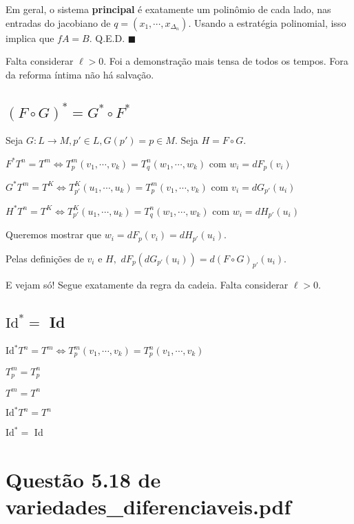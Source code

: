 \documentclass[10pt,a4paper]{article}
\begin{document}
		Em geral, o sistema \textbf{principal} \'e exatamente um polin\^omio de cada lado, nas entradas do jacobiano de $q = (x_1, \cdots, x_{\Delta_n})$. Usando a estrat\'egia polinomial, isso implica que $fA = B$. Q.E.D.$\,\,\blacksquare$

		Falta considerar $\ell > 0$. Foi a demonstra\c{c}\~ao mais tensa de todos os tempos. Fora da reforma \'intima n\~ao h\'a salva\c{c}\~ao.

		\subsection{$(F \circ G)^* = G^* \circ F^*$}
		\begin{flushright}
		\end{flushright}

		Seja $G: L \rightarrow M, p' \in L, G(p') = p \in M$. Seja $H = F \circ G$.

		$F^* T^n = T^m \Leftrightarrow T_p^m(v_1, \cdots, v_k) = T_q^n(w_1, \cdots, w_k)$ com $w_i = dF_p(v_i)$

		$G^* T^m = T^K \Leftrightarrow T_{p'}^K(u_1, \cdots, u_k) = T_p^m(v_1, \cdots, v_k)$ com $v_i = dG_{p'} (u_i)$

		$H^* T^n = T^K \Leftrightarrow T_{p'}^K(u_1, \cdots, u_k) = T_q^n(w_1, \cdots, w_k)$ com $w_i = dH_{p'} (u_i)$

		Queremos mostrar que $w_i = dF_p(v_i) = dH_{p'} (u_i)$.

		Pelas defini\c{c}\~oes de $v_i$ e $H,\,\,dF_p(dG_{p'} (u_i)) = d(F \circ G)_{p'} (u_i)$.

		E vejam s\'o! Segue exatamente da regra da cadeia. Falta considerar $\ell > 0$.

		\subsection{$\text{Id}^* =$ Id}
		\begin{flushright}
		\end{flushright}

		$\text{Id}^* T^n = T^m \Leftrightarrow T_p^m(v_1, \cdots, v_k) = T_p^n(v_1, \cdots, v_k)$

		$T_p^m = T_p^n$

		$T^m = T^n$

		$\text{Id}^* T^n = T^n$

		$\text{Id}^* =$ Id

	\section{Quest\~ao 5.18 de variedades\_diferenciaveis.pdf}
		\begin{flushright}
		\end{flushright}
\end{document}
